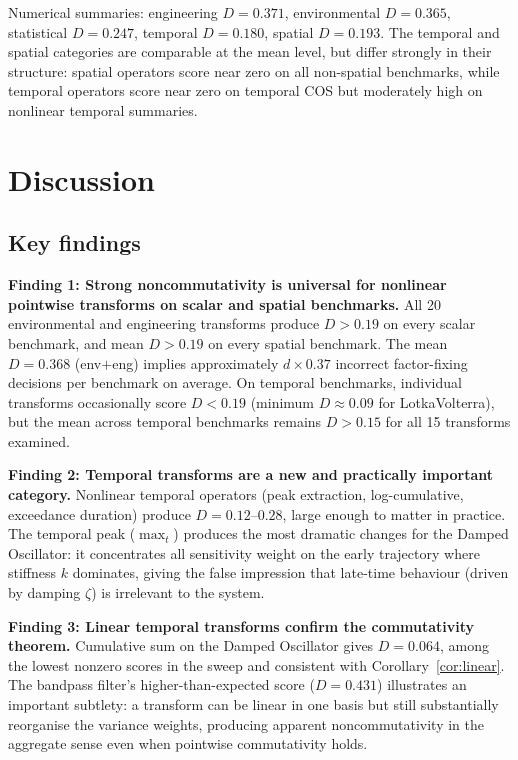 \documentclass[11pt,onecolumn]{article}
\begin{document}
Numerical summaries: engineering $D=0.371$, environmental $D=0.365$,
statistical $D=0.247$, temporal $D=0.180$, spatial $D=0.193$.
The temporal and spatial categories are comparable at the mean level, but differ
strongly in their structure: spatial operators score near zero on all non-spatial
benchmarks, while temporal operators score near zero on temporal COS but
moderately high on nonlinear temporal summaries.

\section{Discussion}
\label{sec:discussion}

\subsection{Key findings}
\label{sec:findings}

\textbf{Finding 1: Strong noncommutativity is universal for nonlinear pointwise
transforms on scalar and spatial benchmarks.}
All 20 environmental and engineering transforms produce $D > 0.19$ on every scalar
benchmark, and mean $D > 0.19$ on every spatial benchmark.
The mean $D = 0.368$ (env$+$eng) implies approximately
$d \times 0.37$ incorrect factor-fixing decisions per benchmark on average.
On temporal benchmarks, individual transforms occasionally score $D < 0.19$
(minimum $D \approx 0.09$ for LotkaVolterra), but the mean across temporal benchmarks
remains $D > 0.15$ for all 15 transforms examined.

\textbf{Finding 2: Temporal transforms are a new and practically important category.}
Nonlinear temporal operators (peak extraction, log-cumulative, exceedance duration)
produce $D = 0.12$--$0.28$, large enough to matter in practice.
The temporal peak ($\max_t$) produces the most dramatic changes for the Damped
Oscillator: it concentrates all sensitivity weight on the early trajectory where
stiffness $k$ dominates, giving the false impression that late-time behaviour
(driven by damping $\zeta$) is irrelevant to the system.

\textbf{Finding 3: Linear temporal transforms confirm the commutativity theorem.}
Cumulative sum on the Damped Oscillator gives $D = 0.064$, among the lowest nonzero
scores in the sweep and consistent with Corollary~\ref{cor:linear}.
The bandpass filter's higher-than-expected score ($D = 0.431$) illustrates
an important subtlety: a transform can be linear in one basis but still
substantially reorganise the variance weights, producing apparent noncommutativity
in the aggregate sense even when pointwise commutativity holds.
\end{document}
